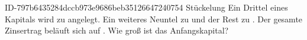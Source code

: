 \begin{exercise}
      {ID-797b6435284dccb973e9686beb35126647240754}
      {Stückelung}
  \ifproblem\problem
    Ein Drittel eines Kapitals wird zu  angelegt. Ein weiteres Neuntel
    zu  und der Rest zu . Der gesamte Zinsertrag beläuft
    sich auf . Wie groß ist das Anfangskapital?
  \fi
\end{exercise}
